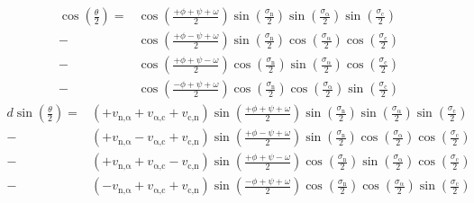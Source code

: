 \documentclass[fleqn,10pt,lineno]{wlpeerj} %
\begin{document}
\begin{align}
\cos\left(\frac{\theta}{2}\right) =&\cos\left(\frac{+\phi+\psi+\omega}{2}\right) \sin\left(\frac{\sigma_\textrm{n}}{2}\right) \sin\left(\frac{\sigma_\upalpha}{2}\right) \sin\left(\frac{\sigma_\textrm{c}}{2}\right) \nonumber \\
                                  -&\cos\left(\frac{+\phi-\psi+\omega}{2}\right) \sin\left(\frac{\sigma_\textrm{n}}{2}\right) \cos\left(\frac{\sigma_\upalpha}{2}\right) \cos\left(\frac{\sigma_\textrm{c}}{2}\right) \nonumber \\
                                  -&\cos\left(\frac{+\phi+\psi-\omega}{2}\right) \cos\left(\frac{\sigma_\textrm{n}}{2}\right) \sin\left(\frac{\sigma_\upalpha}{2}\right) \cos\left(\frac{\sigma_\textrm{c}}{2}\right) \nonumber \\
                                  -&\cos\left(\frac{-\phi+\psi+\omega}{2}\right) \cos\left(\frac{\sigma_\textrm{n}}{2}\right) \cos\left(\frac{\sigma_\upalpha}{2}\right) \sin\left(\frac{\sigma_\textrm{c}}{2}\right)
                                  \label{eqn:theta}
\end{align}
\begin{align} 
d \sin\left(\frac{\theta}{2}\right) = & \left(+v_{\textrm{n,}\upalpha}+v_{\upalpha\textrm{,c}}+v_\textrm{c,n}\right)\sin\left(\frac{+\phi+\psi+\omega}{2}\right)\sin\left(\frac{\sigma_\textrm{n}}{2}\right)\sin\left(\frac{\sigma_\upalpha}{2}\right)\sin\left(\frac{\sigma_\textrm{c}}{2}\right)\nonumber \\
                                    - & \left(+v_{\textrm{n,}\upalpha}-v_{\upalpha\textrm{,c}}+v_\textrm{c,n}\right)\sin\left(\frac{+\phi-\psi+\omega}{2}\right)\sin\left(\frac{\sigma_\textrm{n}}{2}\right)\cos\left(\frac{\sigma_\upalpha}{2}\right)\cos\left(\frac{\sigma_\textrm{c}}{2}\right)\nonumber \\
                                    - & \left(+v_{\textrm{n,}\upalpha}+v_{\upalpha\textrm{,c}}-v_\textrm{c,n}\right)\sin\left(\frac{+\phi+\psi-\omega}{2}\right)\cos\left(\frac{\sigma_\textrm{n}}{2}\right)\sin\left(\frac{\sigma_\upalpha}{2}\right)\cos\left(\frac{\sigma_\textrm{c}}{2}\right)\nonumber \\
                                    - & \left(-v_{\textrm{n,}\upalpha}+v_{\upalpha\textrm{,c}}+v_\textrm{c,n}\right)\sin\left(\frac{-\phi+\psi+\omega}{2}\right)\cos\left(\frac{\sigma_\textrm{n}}{2}\right)\cos\left(\frac{\sigma_\upalpha}{2}\right)\sin\left(\frac{\sigma_\textrm{c}}{2}\right)
                                    \label{eqn:d}
\end{align}
\end{document}
